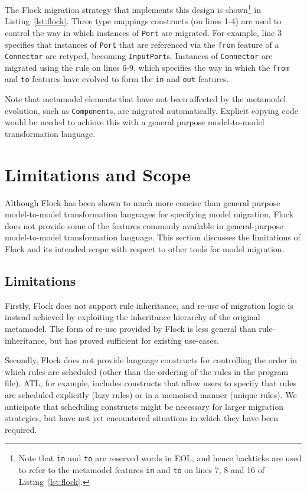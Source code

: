The Flock migration strategy that implements this design is shown\footnote{Note that \texttt{in} and \texttt{to} are reserved words in EOL, and hence backticks are used to refer to the metamodel features \texttt{in} and \texttt{to} on lines 7, 8 and 16 of Listing~\ref{lst:flock}.} in Listing~\ref{lst:flock}. Three type mappings constructs (on lines 1-4) are used to control the way in which instances of \texttt{Po\-rt} are migrated. For example, line 3 specifies that instances of \texttt{Po\-rt} that are referenced via the \texttt{fr\-om} feature of a \texttt{Co\-nn\-ec\-t\-or} are retyped, becoming \texttt{In\-pu\-tPo\-rt}s. Instances of \texttt{Co\-nn\-ec\-t\-or} are migrated using the rule on lines 6-9, which specifies the way in which the \texttt{fr\-om} and \texttt{to} features have evolved to form the \texttt{in} and \texttt{out} features.

Note that metamodel elements that have not been affected by the metamodel evolution, such as \texttt{Co\-mp\-on\-e\-nt}s, are migrated automatically. Explicit copying code would be needed to achieve this with a general purpose model-to-model transformation language.

\section{Limitations and Scope}
Although Flock has been shown to much more concise than general purpose model-to-model transformation languages for specifying model migration, Flock does not provide some of the features commonly available in general-purpose model-to-model transformation language. This section discusses the limitations of Flock and its intended scope with respect to other tools for model migration.

\subsection{Limitations}
Firstly, Flock does not support rule inheritance, and re-use of migration logic is instead achieved by exploiting the inheritance hierarchy of the original metamodel. The form of re-use provided by Flock is less general than rule-inheritance, but has proved sufficient for existing use-cases.

Secondly, Flock does not provide language constructs for controlling the order in which rules are scheduled (other than the ordering of the rules in the program file). ATL, for example, includes constructs that allow users to specify that rules are scheduled explicitly (lazy rules) or in a memoised manner (unique rules). We anticipate that scheduling constructs might be necessary for larger migration strategies, but have not yet encountered situations in which they have been required.

